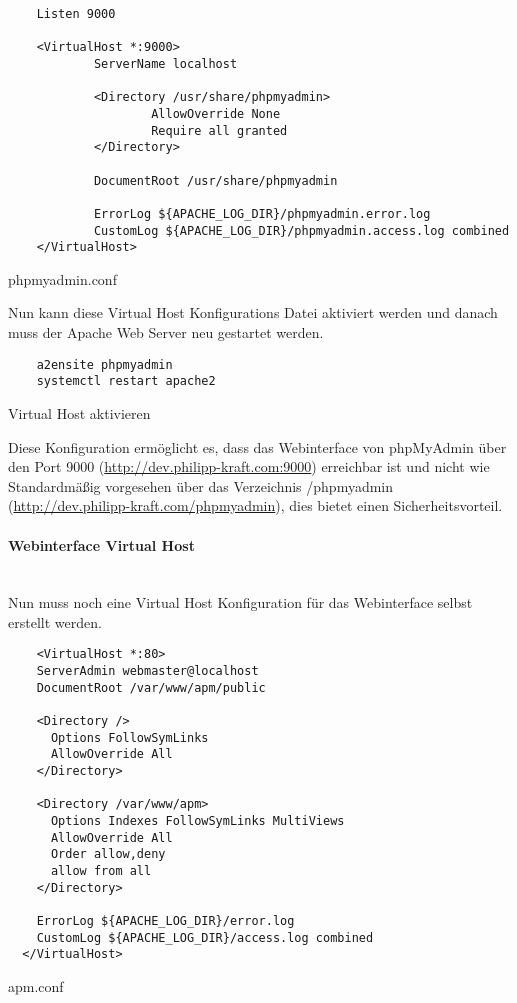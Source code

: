 \begin{listing}[H]
  \begin{verbatim}
    Listen 9000

    <VirtualHost *:9000>
            ServerName localhost
    
            <Directory /usr/share/phpmyadmin>
                    AllowOverride None
                    Require all granted
            </Directory>
    
            DocumentRoot /usr/share/phpmyadmin
    
            ErrorLog ${APACHE_LOG_DIR}/phpmyadmin.error.log
            CustomLog ${APACHE_LOG_DIR}/phpmyadmin.access.log combined
    </VirtualHost>
  \end{verbatim}
  \caption{phpmyadmin.conf}
\end{listing}

Nun kann diese Virtual Host Konfigurations Datei aktiviert werden und danach
muss der Apache Web Server neu gestartet werden.

\begin{listing}[H]
  \begin{verbatim}
    a2ensite phpmyadmin
    systemctl restart apache2
  \end{verbatim}
  \caption{Virtual Host aktivieren}
\end{listing}

Diese Konfiguration ermöglicht es, dass das Webinterface von phpMyAdmin über den
Port 9000 (\url{http://dev.philipp-kraft.com:9000}) erreichbar ist und nicht wie
Standardmäßig vorgesehen über das Verzeichnis /phpmyadmin
(\url{http://dev.philipp-kraft.com/phpmyadmin}), dies bietet einen
Sicherheitsvorteil.

\paragraph{Webinterface Virtual Host}\mbox{}\\

Nun muss noch eine Virtual Host Konfiguration für das Webinterface selbst
erstellt werden.

\begin{listing}[H]
  \begin{verbatim}
    <VirtualHost *:80>
    ServerAdmin webmaster@localhost
    DocumentRoot /var/www/apm/public
          
    <Directory />
      Options FollowSymLinks
      AllowOverride All
    </Directory>
  
    <Directory /var/www/apm>
      Options Indexes FollowSymLinks MultiViews
      AllowOverride All
      Order allow,deny
      allow from all
    </Directory>
  
    ErrorLog ${APACHE_LOG_DIR}/error.log
    CustomLog ${APACHE_LOG_DIR}/access.log combined
  </VirtualHost>
  \end{verbatim}
  \caption{apm.conf}
\end{listing}

